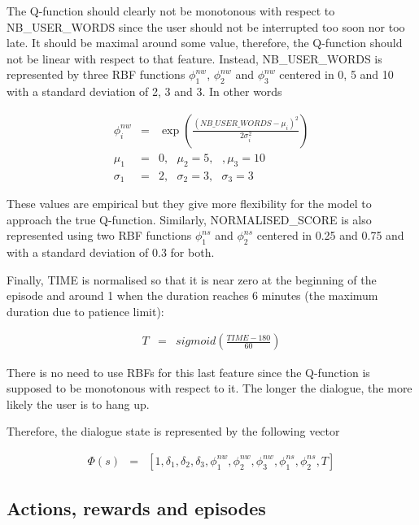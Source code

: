         The Q-function should clearly not be monotonous with respect to NB\_USER\_WORDS since the user should not be interrupted too soon nor too late. It should be maximal around some value, therefore, the Q-function should not be linear with respect to that feature. Instead, NB\_USER\_WORDS is represented by three RBF functions $\phi^{nw}_1$, $\phi^{nw}_2$ and $\phi^{nw}_3$ centered in 0, 5 and 10 with a standard deviation of 2, 3 and 3. In other words
        
				\begin{eqnarray}
					\phi^{nw}_i & = & \exp \left( \frac{(NB\_USER\_WORDS - \mu_i)^2}{2 \sigma_i^2} \right) \\
          \mu_1 & = & 0, \text{ } \mu_2 = 5, \text{ }, \mu_3 = 10 \nonumber \\
          \sigma_1 & = & 2, \text{ } \sigma_2 = 3, \text{ } \sigma_3 = 3 \nonumber
				\end{eqnarray}
            
      	These values are empirical but they give more flexibility for the model to approach the true Q-function. Similarly, NORMALISED\_SCORE is also represented using two RBF functions $\phi^{ns}_1$ and $\phi^{ns}_2$ centered in 0.25 and 0.75 and with a standard deviation of 0.3 for both.
        
        Finally, TIME is normalised so that it is near zero at the beginning of the episode and around 1 when the duration reaches 6 minutes (the maximum duration due to patience limit):
        
				\begin{eqnarray}
					T & = & sigmoid \left( \frac{TIME-180}{60} \right)
				\end{eqnarray}
            
       	There is no need to use RBFs for this last feature since the Q-function is supposed to be monotonous with respect to it. The longer the dialogue, the more likely the user is to hang up.
        
        Therefore, the dialogue state is represented by the following vector
        
				\begin{eqnarray}
					\Phi(s) & = & [1,\delta_1,\delta_2,\delta_3,\phi^{nw}_1,\phi^{nw}_2,\phi^{nw}_3,\phi^{ns}_1,\phi^{ns}_2,T]
				\end{eqnarray}
            
   	\subsection{Actions, rewards and episodes}
    
